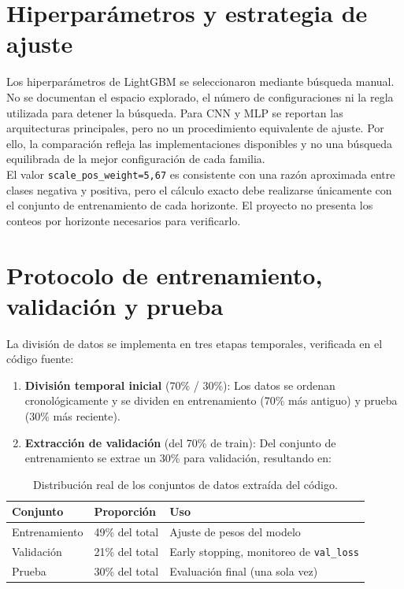 \section{Hiperparámetros y estrategia de ajuste}

Los hiperparámetros de LightGBM se seleccionaron mediante búsqueda manual. No se documentan el espacio explorado, el número de configuraciones ni la regla utilizada para detener la búsqueda. Para CNN y MLP se reportan las arquitecturas principales, pero no un procedimiento equivalente de ajuste. Por ello, la comparación refleja las implementaciones disponibles y no una búsqueda equilibrada de la mejor configuración de cada familia.\\

El valor \texttt{scale\_pos\_weight=5,67} es consistente con una razón aproximada entre clases negativa y positiva, pero el cálculo exacto debe realizarse únicamente con el conjunto de entrenamiento de cada horizonte. El proyecto no presenta los conteos por horizonte necesarios para verificarlo.

\section{Protocolo de entrenamiento, validación y prueba}

La división de datos se implementa en tres etapas temporales, verificada en el código fuente:

\begin{enumerate}
    \item \textbf{División temporal inicial} (70\% / 30\%): Los datos se ordenan cronológicamente y se dividen en entrenamiento (70\% más antiguo) y prueba (30\% más reciente).
    \item \textbf{Extracción de validación} (del 70\% de train): Del conjunto de entrenamiento se extrae un 30\% para validación, resultando en:
\end{enumerate}

\begin{table}[H]
    \centering
    \begin{tabular}{|l|l|l|}
    \hline
        \textbf{Conjunto} & \textbf{Proporción} & \textbf{Uso} \\
    \hline
        Entrenamiento & 49\% del total & Ajuste de pesos del modelo \\
    \hline
        Validación & 21\% del total & Early stopping, monitoreo de \texttt{val\_loss} \\
    \hline
        Prueba & 30\% del total & Evaluación final (una sola vez) \\
    \hline
    \end{tabular}
    \caption{Distribución real de los conjuntos de datos extraída del código.}
\label{tab:splits}
\end{table}

